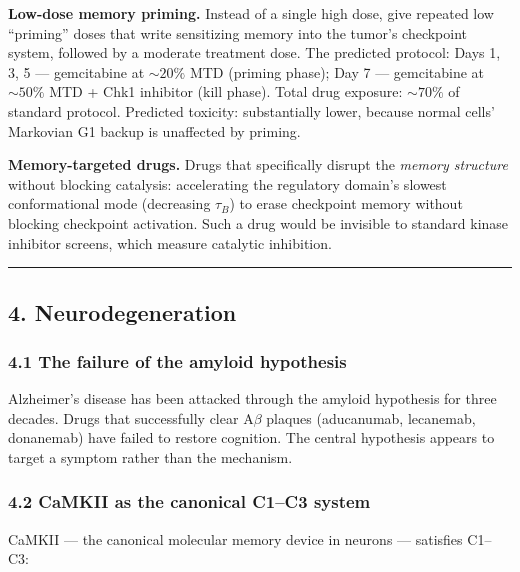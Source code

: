 \documentclass[
  11pt,
]{article}
\begin{document}
\textbf{Low-dose memory priming.} Instead of a single high dose, give
repeated low ``priming'' doses that write sensitizing memory into the
tumor's checkpoint system, followed by a moderate treatment dose. The
predicted protocol: Days 1, 3, 5 --- gemcitabine at \(\sim 20\%\) MTD
(priming phase); Day 7 --- gemcitabine at \(\sim 50\%\) MTD + Chk1
inhibitor (kill phase). Total drug exposure: \(\sim 70\%\) of standard
protocol. Predicted toxicity: substantially lower, because normal cells'
Markovian G1 backup is unaffected by priming.

\textbf{Memory-targeted drugs.} Drugs that specifically disrupt the
\emph{memory structure} without blocking catalysis: accelerating the
regulatory domain's slowest conformational mode (decreasing \(\tau_B\))
to erase checkpoint memory without blocking checkpoint activation. Such
a drug would be invisible to standard kinase inhibitor screens, which
measure catalytic inhibition.

\begin{center}\rule{0.5\linewidth}{0.5pt}\end{center}

\hypertarget{neurodegeneration}{%
\subsection{4. Neurodegeneration}\label{neurodegeneration}}

\hypertarget{the-failure-of-the-amyloid-hypothesis}{%
\subsubsection{4.1 The failure of the amyloid
hypothesis}\label{the-failure-of-the-amyloid-hypothesis}}

Alzheimer's disease has been attacked through the amyloid hypothesis for
three decades. Drugs that successfully clear A\(\beta\) plaques
(aducanumab, lecanemab, donanemab) have failed to restore cognition. The
central hypothesis appears to target a symptom rather than the
mechanism.

\hypertarget{camkii-as-the-canonical-c1c3-system}{%
\subsubsection{4.2 CaMKII as the canonical C1--C3
system}\label{camkii-as-the-canonical-c1c3-system}}

CaMKII --- the canonical molecular memory device in neurons ---
satisfies C1--C3:
\end{document}
